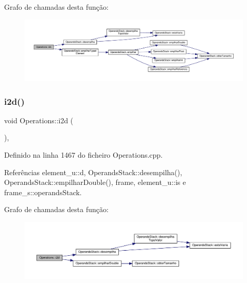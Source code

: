 Grafo de chamadas desta função\+:\nopagebreak
\begin{figure}[H]
\begin{center}
\leavevmode
\includegraphics[width=350pt]{classOperations_a43b01132bf9acf598d0ced8719c194c7_cgraph}
\end{center}
\end{figure}
\mbox{\label{classOperations_aee9ee24acc934bcf51340dc54d6ed231}} 
\subsubsection{\texorpdfstring{i2d()}{i2d()}}
{\footnotesize\ttfamily void Operations\+::i2d (\begin{DoxyParamCaption}{ }\end{DoxyParamCaption})\hspace{0.3cm}{\ttfamily [static]}, {\ttfamily [private]}}



Definido na linha 1467 do ficheiro Operations.\+cpp.



Referências element\+\_\+u\+::d, Operands\+Stack\+::desempilha(), Operands\+Stack\+::empilhar\+Double(), frame, element\+\_\+u\+::is e frame\+\_\+s\+::operands\+Stack.

Grafo de chamadas desta função\+:\nopagebreak
\begin{figure}[H]
\begin{center}
\leavevmode
\includegraphics[width=350pt]{classOperations_aee9ee24acc934bcf51340dc54d6ed231_cgraph}
\end{center}
\end{figure}
\mbox{\label{classOperations_a4880878630a620c325840fc7980dc131}} 
